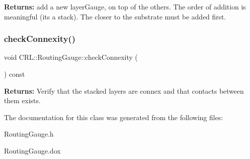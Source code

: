 {\bfseries Returns\+:} add a new {\ttfamily layer\+Gauge}, on top of the others. The order of addition is meaningful (it\textquotesingle{}s a stack). The closer to the substrate must be added first. \mbox{\label{classCRL_1_1RoutingGauge_ae76259fdd9d27d1127ac201c41ab8c20}} 
\subsubsection{\texorpdfstring{check\+Connexity()}{checkConnexity()}}
{\footnotesize\ttfamily void C\+R\+L\+::\+Routing\+Gauge\+::check\+Connexity (\begin{DoxyParamCaption}{ }\end{DoxyParamCaption}) const}

{\bfseries Returns\+:} Verify that the stacked layers are connex and that contacts between them exists. 

The documentation for this class was generated from the following files\+:\begin{DoxyCompactItemize}
\item 
Routing\+Gauge.\+h\item 
Routing\+Gauge.\+dox\end{DoxyCompactItemize}
